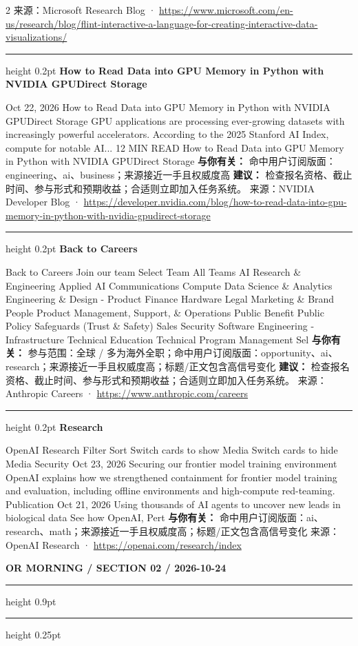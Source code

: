 \documentclass[10.5pt]{ctexart}
\begin{document}
\begin{multicols}{2}
{\footnotesize\color{ormuted} 来源：Microsoft Research Blog · \url{https://www.microsoft.com/en-us/research/blog/flint-interactive-a-language-for-creating-interactive-data-visualizations/}}
\vspace{2mm}
\hrule height 0.2pt
\vspace{2mm}
{\large\bfseries How to Read Data into GPU Memory in Python with NVIDIA GPUDirect Storage}\par
Oct 22, 2026 How to Read Data into GPU Memory in Python with NVIDIA GPUDirect Storage GPU applications are processing ever-growing datasets with increasingly powerful accelerators. According to the 2025 Stanford AI Index, compute for notable AI... 12 MIN READ How to Read Data into GPU Memory in Python with NVIDIA GPUDirect Storage
\textbf{与你有关：} 命中用户订阅版面：engineering、ai、business；来源接近一手且权威度高
\textbf{建议：} 检查报名资格、截止时间、参与形式和预期收益；合适则立即加入任务系统。
{\footnotesize\color{ormuted} 来源：NVIDIA Developer Blog · \url{https://developer.nvidia.com/blog/how-to-read-data-into-gpu-memory-in-python-with-nvidia-gpudirect-storage}}
\vspace{2mm}
\hrule height 0.2pt
\vspace{2mm}
{\large\bfseries Back to Careers}\par
Back to Careers Join our team Select Team All Teams AI Research \& Engineering Applied AI Communications Compute Data Science \& Analytics Engineering \& Design - Product Finance Hardware Legal Marketing \& Brand People Product Management, Support, \& Operations Public Benefit Public Policy Safeguards (Trust \& Safety) Sales Security Software Engineering - Infrastructure Technical Education Technical Program Management Sel
\textbf{与你有关：} 参与范围：全球 / 多为海外全职；命中用户订阅版面：opportunity、ai、research；来源接近一手且权威度高；标题/正文包含高信号变化
\textbf{建议：} 检查报名资格、截止时间、参与形式和预期收益；合适则立即加入任务系统。
{\footnotesize\color{ormuted} 来源：Anthropic Careers · \url{https://www.anthropic.com/careers}}
\vspace{2mm}
\hrule height 0.2pt
\vspace{2mm}
{\large\bfseries Research}\par
OpenAI Research Filter Sort Switch cards to show Media Switch cards to hide Media Security Oct 23, 2026 Securing our frontier model training environment OpenAI explains how we strengthened containment for frontier model training and evaluation, including offline environments and high-compute red-teaming. Publication Oct 21, 2026 Using thousands of AI agents to uncover new leads in biological data See how OpenAI, Pert
\textbf{与你有关：} 命中用户订阅版面：ai、research、math；来源接近一手且权威度高；标题/正文包含高信号变化
{\footnotesize\color{ormuted} 来源：OpenAI Research · \url{https://openai.com/research/index}}
\end{multicols}
\newpage
{\small\bfseries OR MORNING / SECTION 02 / 2026-10-24}
\vspace{2mm}
\hrule height 0.9pt
\vspace{1.5mm}
\hrule height 0.25pt
\vspace{4mm}
\end{document}
